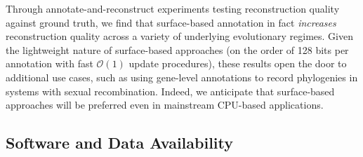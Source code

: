 Through annotate-and-reconstruct experiments testing reconstruction quality against ground truth, we find that surface-based annotation in fact \textit{increases} reconstruction quality across a variety of underlying evolutionary regimes.
Given the lightweight nature of surface-based approaches (on the order of 128 bits per annotation with fast $\mathcal{O}(1)$ update procedures), these results open the door to additional use cases, such as using gene-level annotations to record phylogenies in systems with sexual recombination.
Indeed, we anticipate that surface-based approaches will be preferred even in mainstream CPU-based applications.



\subsection{Software and Data Availability}


